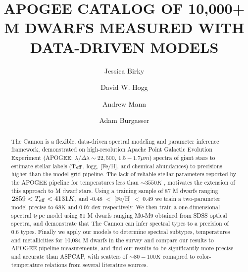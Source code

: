 \documentclass[preprint]{aastex62}
\begin{document}
\title{APOGEE CATALOG OF 10,000+ M DWARFS MEASURED WITH DATA-DRIVEN MODELS}


\author[0000-0002-7961-6881]{Jessica Birky}

\author[0000-0003-2866-9403]{David W. Hogg}

\author[0000-0003-3654-1602]{Andrew Mann}

\author[0000-0002-6523-9536]{Adam Burgasser}

\begin{abstract}

The Cannon \citep{Ness:2015} is a flexible, data-driven spectral modeling and parameter inference framework, demonstrated on high-resolution Apache Point Galactic Evolution Experiment (APOGEE; $\lambda/\Delta\lambda\sim22,500$, $1.5-1.7 \mu m$) spectra of giant stars to estimate stellar labels (T$_{\rm eff}$, logg, [Fe/H], and chemical abundances) to precisions higher than the model-grid pipeline. The lack of reliable stellar parameters reported by the APOGEE pipeline for temperatures less than $\sim3550K$ \citep{Schmidt:2016}, motivates the extension of this approach to M dwarf stars. Using a training sample of 87 M dwarfs ranging $2859 < T_{\rm eff} < 4131K$, and -0.48 $<$ [Fe/H] $<$ 0.49 we train a two-parameter model precise to 68K and 0.07 dex respectively. We then train a one-dimensional spectral type model using 51 M dwarfs ranging M0-M9 obtained from SDSS optical spectra, and demonstrate that The Cannon can infer spectral types to a precision of 0.6 types. Finally we apply our models to determine spectral subtypes, temperatures and metallicities for 10,084 M dwarfs in the survey and compare our results to APOGEE pipeline measurements, and find our results to be significantly more precise and accurate than ASPCAP, with scatters of $\sim80-100K$ comapred to color-temperature relations from several literature sources.

\end{abstract}
\end{document}
